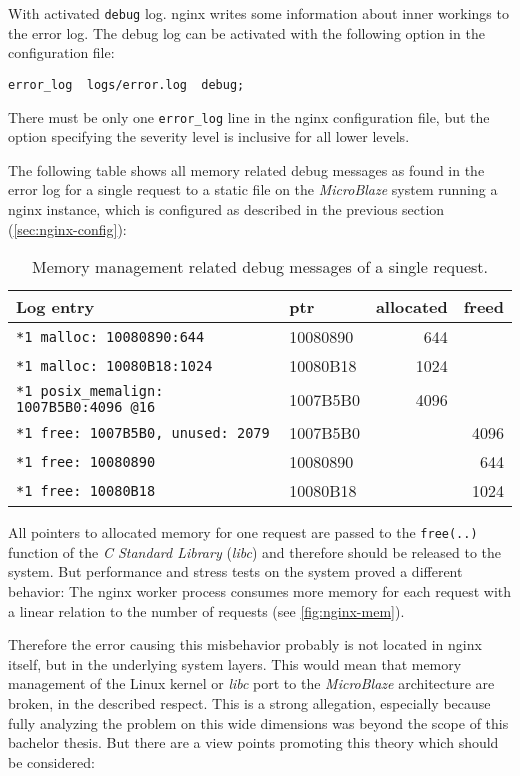 With activated \texttt{debug} log. nginx writes some information about inner workings to the error log. The debug log can be activated with the following option in the configuration file:

\begin{verbatim}
error_log  logs/error.log  debug;
\end{verbatim}

There must be only one \texttt{error\_log} line in the nginx configuration file, but the option specifying the severity level is inclusive for all lower levels.

The following table shows all memory related debug messages as found in the error log for a single request to a static file on the \textit{MicroBlaze} system running a nginx instance, which is configured as described in the previous section (\ref{sec:nginx-config}):

\begin{table}[H]
\centering
\begin{tabular}{|l|l|r|r|}
    \hline
     \textbf{Log entry} & \textbf{ptr} & \textbf{allocated} & \textbf{freed} \\
    \hline \hline
\texttt{*1 malloc: 10080890:644} & 10080890 & 644 &  \\ \hline
\texttt{*1 malloc: 10080B18:1024} & 10080B18 & 1024 &  \\ \hline
\texttt{*1 posix\_memalign: 1007B5B0:4096 @16} & 1007B5B0 & 4096 &  \\ \hline \hline
\texttt{*1 free: 1007B5B0, unused: 2079} & 1007B5B0 & & 4096 \\ \hline
\texttt{*1 free: 10080890} & 10080890 & & 644 \\ \hline
\texttt{*1 free: 10080B18} & 10080B18 & & 1024 \\ \hline
\end{tabular}
\caption{Memory management related debug messages of a single request.}
\label{tab:debug_mem}
\end{table}

All pointers to allocated memory for one request are passed to the \texttt{free(..)} function of the \textit{C Standard Library} (\textit{libc}) and therefore should be released to the system. But performance and stress tests on the system proved a different behavior: The nginx worker process consumes more memory for each request with a linear relation to the number of requests (see \ref{fig:nginx-mem}).

Therefore the error causing this misbehavior probably is not located in nginx itself, but in the underlying system layers. This would mean that memory management of the Linux kernel or \textit{libc} port to the \textit{MicroBlaze} architecture are broken, in the described respect. This is a strong allegation, especially because fully analyzing the problem on this wide dimensions was beyond the scope of this bachelor thesis. But there are a view points promoting this theory which should be considered:

